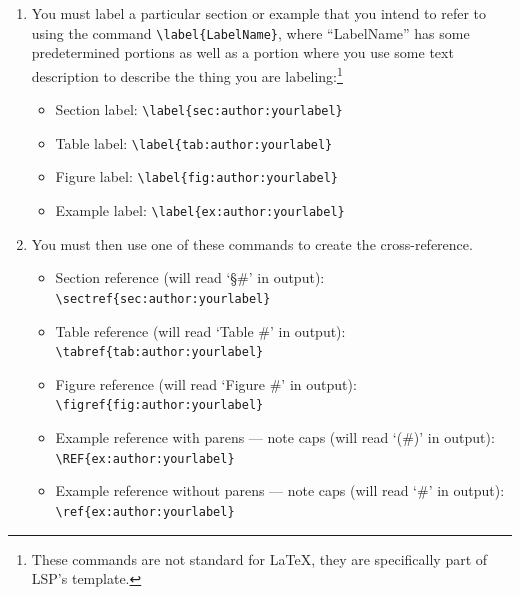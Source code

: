 \documentclass[output=paper,colorlinks,citecolor=brown]{langscibook}
\begin{document}
\begin{enumerate}    

\item You must label a particular section or example that you intend to refer to using the command \verb|\label{LabelName}|, where ``LabelName'' has some predetermined portions as well as a portion where you use some text description to describe the thing you are labeling:\footnote{These commands are not standard for \LaTeX{}, they are specifically part of LSP's template.} 

\begin{itemize}

\item Section label: \verb|\label{sec:author:yourlabel}|

\item Table label: \verb|\label{tab:author:yourlabel}|

\item Figure label: \verb|\label{fig:author:yourlabel}|

\item Example label: \verb|\label{ex:author:yourlabel}|

\end{itemize}
    
    
\item You must then use one of these commands to create the cross-reference. 

\begin{itemize}

\item Section reference (will read `\S \#’ in output):\\ \verb|\sectref{sec:author:yourlabel}|

\item Table reference (will read `Table \#’ in output):\\ \verb|\tabref{tab:author:yourlabel}|

\item Figure reference (will read `Figure \#’ in output): \\ \verb|\figref{fig:author:yourlabel}|

\item Example reference with parens — note caps (will read `(\#)’ in output): \\ \verb|\REF{ex:author:yourlabel}| 

\item Example reference without parens — note caps (will read `\#’ in output): \\ \verb|\ref{ex:author:yourlabel}|


\end{itemize}
\end{enumerate}
\end{document}
